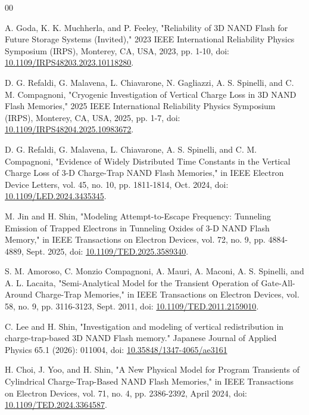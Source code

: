 \documentclass[journal,twoside,web]{ieeecolor}
\begin{document}
\begin{thebibliography}{00}

 A. Goda, K. K. Muchherla, and P. Feeley, "Reliability of 3D NAND Flash for Future Storage Systems (Invited)," 2023 IEEE International Reliability Physics Symposium (IRPS), Monterey, CA, USA, 2023, pp. 1-10, doi: \href{https://doi.org/10.1109/IRPS48203.2023.10118280}{10.1109/IRPS48203.2023.10118280}.

 D. G. Refaldi, G. Malavena, L. Chiavarone, N. Gagliazzi, A. S. Spinelli, and C. M. Compagnoni, "Cryogenic Investigation of Vertical Charge Loss in 3D NAND Flash Memories," 2025 IEEE International Reliability Physics Symposium (IRPS), Monterey, CA, USA, 2025, pp. 1-7, doi: \href{https://doi.org/10.1109/IRPS48204.2025.10983672}{10.1109/IRPS48204.2025.10983672}.

 D. G. Refaldi, G. Malavena, L. Chiavarone, A. S. Spinelli, and C. M. Compagnoni, "Evidence of Widely Distributed Time Constants in the Vertical Charge Loss of 3-D Charge-Trap NAND Flash Memories," in IEEE Electron Device Letters, vol. 45, no. 10, pp. 1811-1814, Oct. 2024, doi: \href{https://doi.org/10.1109/LED.2024.3435345}{10.1109/LED.2024.3435345}.

 M. Jin and H. Shin, "Modeling Attempt-to-Escape Frequency: Tunneling Emission of Trapped Electrons in Tunneling Oxides of 3-D NAND Flash Memory," in IEEE Transactions on Electron Devices, vol. 72, no. 9, pp. 4884-4889, Sept. 2025, doi: \href{https://doi.org/10.1109/TED.2025.3589340}{10.1109/TED.2025.3589340}.

 S. M. Amoroso, C. Monzio Compagnoni, A. Mauri, A. Maconi, A. S. Spinelli, and A. L. Lacaita, "Semi-Analytical Model for the Transient Operation of Gate-All-Around Charge-Trap Memories," in IEEE Transactions on Electron Devices, vol. 58, no. 9, pp. 3116-3123, Sept. 2011, doi: \href{https://doi.org/10.1109/TED.2011.2159010}{10.1109/TED.2011.2159010}.

 C. Lee and H. Shin, "Investigation and modeling of vertical redistribution in charge-trap-based 3D NAND Flash memory." Japanese Journal of Applied Physics 65.1 (2026): 011004, doi: \href{https://doi.org/10.35848/1347-4065/ae3161}{10.35848/1347-4065/ae3161}

 H. Choi, J. Yoo, and H. Shin, "A New Physical Model for Program Transients of Cylindrical Charge-Trap-Based NAND Flash Memories," in IEEE Transactions on Electron Devices, vol. 71, no. 4, pp. 2386-2392, April 2024, doi: \href{https://doi.org/10.1109/TED.2024.3364587}{10.1109/TED.2024.3364587}.


\end{thebibliography}
\end{document}
